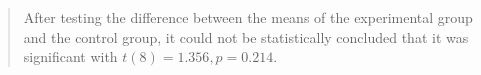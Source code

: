 \begin{quote}
	After testing the difference between the means of the experimental group and the control group, it could not be statistically concluded that it was significant with $t(8)=1.356,p=0.214$.
\end{quote}
